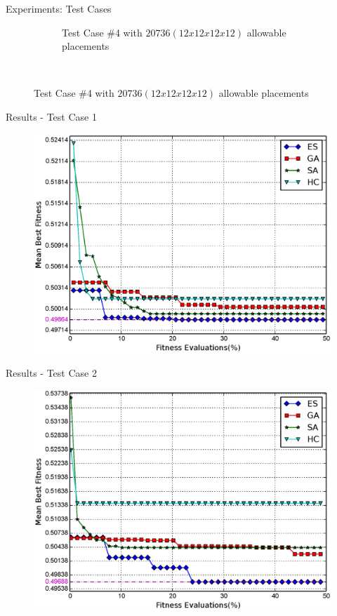 \documentclass{beamer}
\begin{document}
\begin{frame}{Experiments: Test Cases}
\begin{figure}
\begin{subfigure}{.5\columnwidth}
            \caption*{\tiny Test Case \#4 with $20736 (12x12x12x12)$ allowable placements}%
        \end{subfigure}\hfill\\%
    \end{figure}
\end{frame}

\begin{frame}{Results - Test Case 1}
    \begin{figure}
        \vspace*{-0.35cm}
        \centering
        \includegraphics[scale=0.48]{../paper/FIG/tc1_mf}
    \end{figure}
\end{frame}

\begin{frame}{Results - Test Case 2}
    \begin{figure}
        \vspace*{-0.35cm}
        \centering
        \includegraphics[scale=0.48]{../paper/FIG/tc2_mf}
    \end{figure}
\end{frame}
\end{document}
